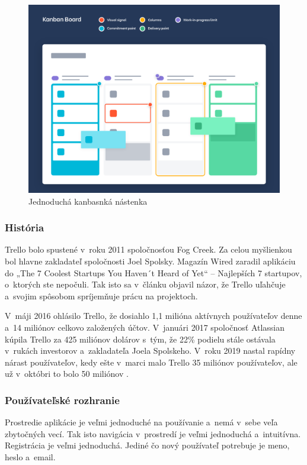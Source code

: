 \begin{figure}[H]
    \centering
    \includegraphics[scale=0.25]{img/obr4.png}
    \caption{Jednoduchá kanbasnká nástenka \cite{kaban_board}}
    \label{fig:kab-nas}
\end{figure}

\subsubsection{História}
\indent Trello bolo spustené v roku 2011 spoločnosťou Fog Creek. Za celou myšlienkou bol hlavne zakladateľ spoločnosti Joel Spolsky. Magazín Wired zaradil aplikáciu do „The 7 Coolest Startups You Haven´t Heard of Yet“ – Najlepších 7 startupov, o ktorých ste nepočuli. Tak isto sa v článku objavil názor, že Trello uľahčuje a svojim spôsobom spríjemňuje prácu na projektoch. 

\indent V máji 2016 ohlásilo Trello, že dosiahlo 1,1 milióna aktívnych používateľov denne a 14 miliónov celkovo založených účtov. V januári 2017 spoločnosť Atlassian kúpila Trello za 425 miliónov dolárov s tým, že 22\% podielu stále ostávala v rukách investorov a zakladateľa Joela Spolskeho. V roku 2019 nastal rapídny nárast používateľov, kedy ešte v marci malo Trello 35 miliónov používateľov, ale už v októbri to bolo 50 miliónov \cite{trello}.
\subsubsection{Používateľské rozhranie}
\indent Prostredie aplikácie je veľmi jednoduché na používanie a nemá v sebe veľa zbytočných vecí. Tak isto navigácia v prostredí je veľmi jednoduchá a intuitívna. Registrácia je veľmi jednoduchá. Jediné čo nový používateľ potrebuje je meno, heslo a email. 

